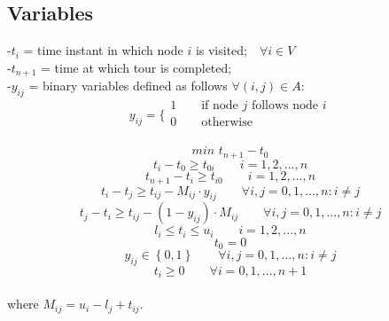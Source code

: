 \documentclass[a4paper,12pt,titlepage]{article}
\begin{document}
\subsection*{Variables}
-$t_i$ = 
time instant in which node $i$ is visited;\,\,\,\ $\forall i\in V$\\
-$t_{n+1}$ =  time at which tour is completed;\\
-$y_{ij}$ = binary variables defined as follows $\forall (i,j)\in A$:
$$y_{ij}=
\bigg \{
\begin{array}{ll}
1\qquad \text{if node $j$ follows node $i$}\\
0\qquad \text{otherwise}\\
\end{array}
$$

\newpage

\begin{equation}
min\,\,t_{n+1}-t_0 
\tag{1}
\end{equation}
\begin{equation}
t_i-t_0 \geq t_{0i} \qquad i=1,2,...,n
\tag{2}
\end{equation}
\begin{equation}
t_{n+1}-t_i \geq t_{i0} \qquad i=1,2,...,n 
\tag{3}
\end{equation}
\begin{equation}
t_i-t_{j}\geq t_{ij}- M_{ij}\cdot y_{ij}  \qquad \forall i,j=0,1,...,n : i\neq j
\tag{4}
\end{equation}
\begin{equation}
t_j-t_{i}\geq t_{ij}- (1-y_{ij})\cdot M_{ij} \qquad \forall i,j=0,1,...,n : i\neq j
\tag{5}
\end{equation}
\begin{equation}
l_i\leq t_i \leq u_i \qquad i=1,2,...,n
\tag{6}
\end{equation}
\begin{equation}
t_0=0
\tag{7}
\end{equation}
\begin{equation}
y_{ij} \in \left\lbrace 0,1\right\rbrace \qquad \forall i,j=0,1,...,n: i\neq j
\tag{8}
\end{equation}
\begin{equation}
t_i \geq 0 \qquad \forall i=0,1,...,n+1
\tag{9}
\end{equation}
\\
where $ M_{ij} = u_i - l_j + t_{ij}$.
\end{document}
